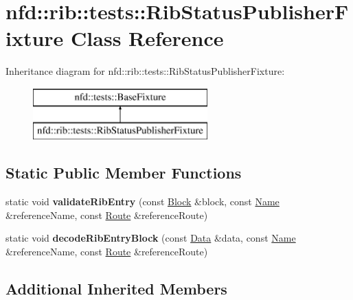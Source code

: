 \hypertarget{classnfd_1_1rib_1_1tests_1_1RibStatusPublisherFixture}{}\section{nfd\+:\+:rib\+:\+:tests\+:\+:Rib\+Status\+Publisher\+Fixture Class Reference}
\label{classnfd_1_1rib_1_1tests_1_1RibStatusPublisherFixture}
Inheritance diagram for nfd\+:\+:rib\+:\+:tests\+:\+:Rib\+Status\+Publisher\+Fixture\+:\begin{figure}[H]
\begin{center}
\leavevmode
\includegraphics[height=2.000000cm]{classnfd_1_1rib_1_1tests_1_1RibStatusPublisherFixture}
\end{center}
\end{figure}
\subsection*{Static Public Member Functions}
\begin{DoxyCompactItemize}
\item 
static void {\bfseries validate\+Rib\+Entry} (const \hyperlink{classndn_1_1Block}{Block} \&block, const \hyperlink{classndn_1_1Name}{Name} \&reference\+Name, const \hyperlink{classnfd_1_1rib_1_1Route}{Route} \&reference\+Route)\hypertarget{classnfd_1_1rib_1_1tests_1_1RibStatusPublisherFixture_a152966f1ab29e0a2af23fa6ce4d6da29}{}\label{classnfd_1_1rib_1_1tests_1_1RibStatusPublisherFixture_a152966f1ab29e0a2af23fa6ce4d6da29}

\item 
static void {\bfseries decode\+Rib\+Entry\+Block} (const \hyperlink{classndn_1_1Data}{Data} \&data, const \hyperlink{classndn_1_1Name}{Name} \&reference\+Name, const \hyperlink{classnfd_1_1rib_1_1Route}{Route} \&reference\+Route)\hypertarget{classnfd_1_1rib_1_1tests_1_1RibStatusPublisherFixture_a8f47ef29cd9ff6f3339384de7e15b162}{}\label{classnfd_1_1rib_1_1tests_1_1RibStatusPublisherFixture_a8f47ef29cd9ff6f3339384de7e15b162}

\end{DoxyCompactItemize}
\subsection*{Additional Inherited Members}


